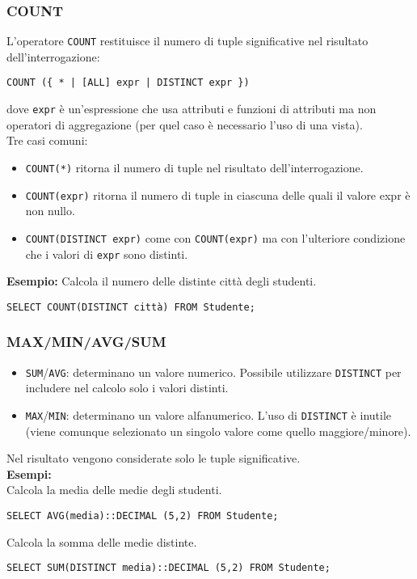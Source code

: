 \documentclass[a4paper, 10pt, titlepage]{article}
\begin{document}
		\subsubsection*{COUNT}
		L'operatore \lstinline|COUNT| restituisce il numero di tuple significative nel risultato dell’interrogazione:
		\begin{lstlisting}
COUNT ({ * | [ALL] expr | DISTINCT expr })
		\end{lstlisting}
		dove \lstinline|expr| è un’espressione che usa attributi e funzioni di attributi ma non
		operatori di aggregazione (per quel caso è necessario l'uso di una vista).\\
		Tre casi comuni:
		\begin{itemize}
			\item \lstinline|COUNT(*)| ritorna il numero di tuple nel risultato dell’interrogazione.
			\item \lstinline|COUNT(expr)| ritorna il numero di tuple in ciascuna delle quali il valore
			expr è non nullo.
			\item \lstinline|COUNT(DISTINCT expr)| come con \lstinline|COUNT(expr)| ma con l’ulteriore
			condizione che i valori di \lstinline|expr| sono distinti.
		\end{itemize} \medskip
		\textbf{Esempio: }Calcola il numero delle distinte città degli studenti.
		\begin{lstlisting}
SELECT COUNT(DISTINCT città) FROM Studente;
		\end{lstlisting}
		\subsubsection*{MAX/MIN/AVG/SUM}
\begin{itemize}
	\item \lstinline|SUM|/\lstinline|AVG|: determinano un valore numerico. Possibile utilizzare \lstinline|DISTINCT| per includere nel calcolo solo i valori distinti.
	\item \lstinline|MAX|/\lstinline|MIN|: determinano un valore alfanumerico. L'uso di \lstinline|DISTINCT| è inutile (viene comunque selezionato un singolo valore come quello maggiore/minore).
\end{itemize}				
		Nel risultato vengono considerate solo le tuple significative.\medskip \\ 
		\textbf{Esempi: }\medskip \\
		Calcola la media delle medie degli studenti.
		\begin{lstlisting}
SELECT AVG(media)::DECIMAL (5,2) FROM Studente;
		\end{lstlisting}
		Calcola la somma delle medie distinte.
		\begin{lstlisting}
SELECT SUM(DISTINCT media)::DECIMAL (5,2) FROM Studente;
		\end{lstlisting}
		\newpage
		
\end{document}
